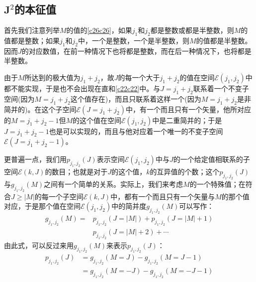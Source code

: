 \documentclass[]{article}
\begin{document}
\subsection{$\boldsymbol{J}^2$的本征值}
首先我们注意列举$M$的值的\eqref{c26c26}，如果$j_1$和$j_2$都是整数或都是半整数，则$M$的值都是整数；如果$j_1$和$j_2$中，一个是整数，一个是半整数，则$M$的值都是半整数。因而$J$的对应数值，在前一种情况下也将都是整数，而在后一种情况下，也将都是半整数。\par 
由于$M$所达到的极大值为$j_1+j_2$，故$J$的每一个大于$j_1+j_2$的值在空间$\mathscr{E}(j_1,j_2)$中都不能实现，于是也不会出现在直和\eqref{c22c22}中。与$J=j_1+j_2$联系着一个不变子空间(因为$M=j_1+j_2$这个值存在)，而且只联系着这样一个(因为$M=j_1+j_2$是非简并的)。在这个子空间$\mathscr{E}(J=j_1+j_2)$中，有一个而且只有一个矢量，他所对应的$M=j_1+j_2-1$但$M$的这个值在空间$\mathscr{E}(j_1,j_2)$中是二重简并的；于是$J=j_1+j_2-1$也是可以实现的，而且与他对应着一个唯一的不变子空间$\mathscr{E}(J=j_1+j_2-1)$。\par 
更普遍一点，我们用$p_{j_1,j_2}(J)$表示空间$\mathscr{E}(j_1,j_2)$中与$J$的一个给定值相联系的子空间$\mathscr{E}(k,J)$的数目；也就是对于$J$的这个值，$k$的互异值的个数；这个$p_{j_1,j_2}(J)$与$g_{j_1,j_2}(M)$之间有一个简单的关系。实际上，我们来考虑$M$的一个特殊值；在符合$J\geqslant|M|$的每一个子空间$\mathscr{E}(k,J)$中，都有一个而且只有一个矢量与$M$的那个值对应，于是那个值在空间$\mathscr{E}(j_1,j_2)$中的简并度$g_{j_1,j_2}(M)$可以写作：
\begin{align}
	g_{j_1,j_2}(M)=&p_{j_1,j_2}(J=|M|)+p_{j_1,j_2}(J=|M|+1)\nonumber\\
	&p_{j_1,j_2}(J=|M|+2)+\cdots 
\end{align}
由此式，可以反过来用$g_{j_1,j_2}(M)$来表示$p_{j_1,j_2}(J)$：
\begin{align}
	p_{j_1,j_2}(J)&=g_{j_1,j_2}(M=J)-g_{j_1,j_2}(M=J-1)\nonumber\\
	&=g_{j_1,j_2}(M=-J)-g_{j_1,j_2}(M=-J-1)
\end{align}
\end{document}
